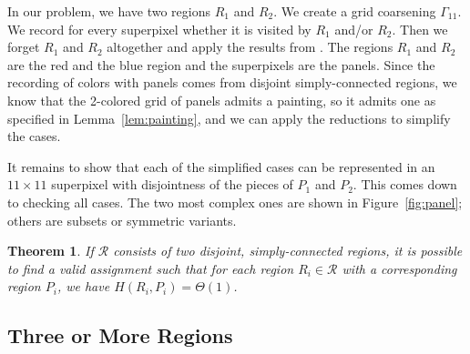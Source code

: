 \documentclass[a4paper, 11pt]{article}
\newtheorem{theorem}{Theorem}
\begin{document}
In our problem, we have two regions $R_1$ and $R_2$. We create a grid coarsening $\Gamma_{11}$. We record for every superpixel whether it is visited by $R_1$ and/or $R_2$.
Then we forget $R_1$ and $R_2$ altogether and apply the results from \cite{goethem2017painter}. The regions $R_1$ and $R_2$ are the red and the blue region and the superpixels are the panels. Since the recording of colors with panels comes from disjoint simply-connected regions, we know that the 2-colored grid of panels admits a painting, so it admits one as specified in Lemma~\ref{lem:painting}, and we can apply the reductions to simplify the cases.

It remains to show that each of the simplified cases can be represented in an $11\times 11$ superpixel with disjointness of the pieces of $P_1$ and $P_2$. This comes down to checking all cases. The two most complex ones are shown in Figure~\ref{fig:panel}; others are subsets or symmetric variants.

\begin{theorem}
If $\mathcal{R}$ consists of two disjoint, simply-connected regions, it is possible to find a valid assignment such that for each region $R_i \in \mathcal{R}$ with a corresponding region $P_i$, we have $H(R_i, P_i) = \Theta(1)$.
\end{theorem}



\subsection{Three or More Regions}
\label{subsec:three}
\end{document}
